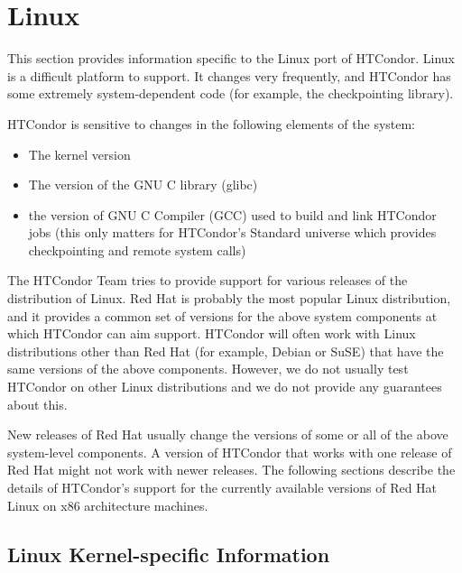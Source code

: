 \section{\label{sec:platform-linux}Linux}

This section provides information specific to the Linux port of
HTCondor.
Linux is a difficult platform to support.
It changes very frequently, and HTCondor has some extremely
system-dependent code (for example, the checkpointing library).

HTCondor is sensitive to changes in the following elements of the
system: 
\begin{itemize}
\item The kernel version
\item The version of the GNU C library (glibc)
\item the version of GNU C Compiler (GCC) used to build and link
  HTCondor jobs (this only matters for HTCondor's Standard universe which
  provides checkpointing and remote system calls)
\end{itemize}

The HTCondor Team tries to provide support for various releases of the
distribution of Linux.
Red Hat is probably the most popular Linux distribution, and it
provides a common set of versions for the above system components
at which HTCondor can aim support.
HTCondor will often work with Linux distributions other than Red Hat (for
example, Debian or SuSE) that have the same versions of the above
components.
However, we do not usually test HTCondor on other Linux distributions
and we do not provide any guarantees about this.

New releases of Red Hat usually change the versions of some or all of
the above system-level components.
A version of HTCondor that works with one release of Red Hat might not
work with newer releases.
The following sections describe the details of HTCondor's support for
the currently available versions of Red Hat Linux on x86 architecture
machines.

\subsection{\label{sec:platform-linux-activity}Linux Kernel-specific Information}

